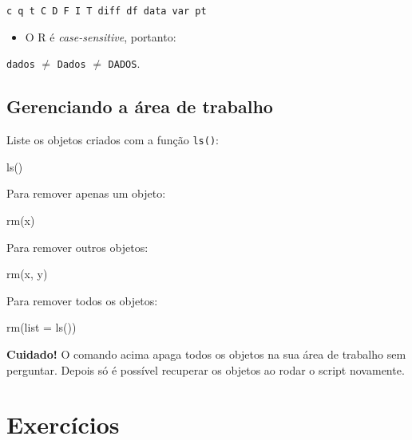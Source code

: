 \documentclass[
  10pt,
  a4paper]{book}
\newenvironment{Shaded}{\begin{snugshade}}{\end{snugshade}}
\newcommand{\AttributeTok}[1]{\textcolor[rgb]{0.77,0.63,0.00}{#1}}
\newcommand{\FunctionTok}[1]{\textcolor[rgb]{0.00,0.00,0.00}{#1}}
\newcommand{\NormalTok}[1]{#1}
\providecommand{\tightlist}{%
  \setlength{\itemsep}{0pt}\setlength{\parskip}{0pt}}
\begin{document}
\texttt{c\ q\ t\ C\ D\ F\ I\ T\ diff\ df\ data\ var\ pt}

\begin{itemize}
\tightlist
\item
  O R é \emph{case-sensitive}, portanto:
\end{itemize}

\texttt{dados} \(\neq\) \texttt{Dados} \(\neq\) \texttt{DADOS}.

\hypertarget{gerenciando-a-uxe1rea-de-trabalho}{%
\subsection{Gerenciando a área de trabalho}\label{gerenciando-a-uxe1rea-de-trabalho}}

Liste os objetos criados com a função \texttt{ls()}:

\begin{Shaded}
\begin{Highlighting}[]
\FunctionTok{ls}\NormalTok{()}
\end{Highlighting}
\end{Shaded}

Para remover apenas um objeto:

\begin{Shaded}
\begin{Highlighting}[]
\FunctionTok{rm}\NormalTok{(x)}
\end{Highlighting}
\end{Shaded}

Para remover outros objetos:

\begin{Shaded}
\begin{Highlighting}[]
\FunctionTok{rm}\NormalTok{(x, y)}
\end{Highlighting}
\end{Shaded}

Para remover todos os objetos:

\begin{Shaded}
\begin{Highlighting}[]
\FunctionTok{rm}\NormalTok{(}\AttributeTok{list =} \FunctionTok{ls}\NormalTok{())}
\end{Highlighting}
\end{Shaded}

\textbf{Cuidado!} O comando acima apaga todos os objetos na sua área de
trabalho sem perguntar. Depois só é possível recuperar os objetos ao
rodar o script novamente.

\hypertarget{exercuxedcios-2}{%
\section*{Exercícios}\label{exercuxedcios-2}}
\end{document}
